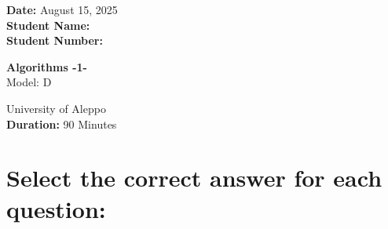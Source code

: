 \documentclass[12pt]{article}
\begin{document}
\begin{minipage}[t]{0.3\textwidth}
    \textbf{Date:} August 15, 2025\\[0.5em]
    \textbf{Student Name: }\\[0.5em]
    \textbf{Student Number: }
\end{minipage}
\begin{minipage}[t]{0.3\textwidth}
    \centering
    \Large\textbf{Algorithms -1-}\\[0.5em]
    \Large{Model:} D\\[0.5em]
\end{minipage}\hfill
\begin{minipage}[t]{0.3\textwidth}
    \raggedleft
    University of Aleppo\\[0.5em]
    \textbf{Duration: }90 Minutes
\end{minipage}

\vspace{1.5cm}

\section*{\small Select the correct answer for each question:}
\end{document}
